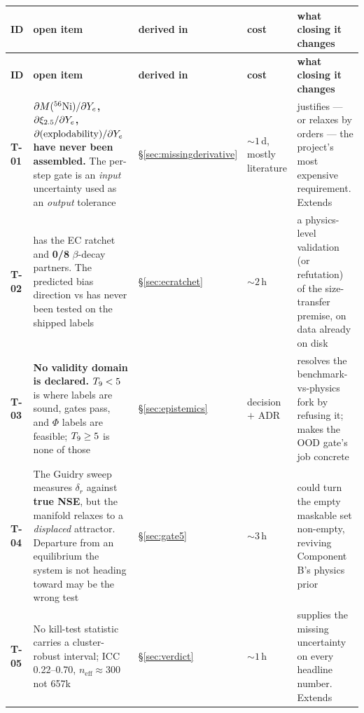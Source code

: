 \begingroup
\footnotesize\setlength{\tabcolsep}{2pt}
\begin{longtable}{@{}L{1.0cm} L{6.0cm} L{2.2cm} L{1.7cm} L{4.7cm}@{}}
\toprule
\textbf{ID} & \textbf{open item} & \textbf{derived in} & \textbf{cost} &
\textbf{what closing it changes} \\
\midrule
\endfirsthead
\toprule
\textbf{ID} & \textbf{open item} & \textbf{derived in} & \textbf{cost} &
\textbf{what closing it changes} \\
\midrule
\endhead
\bottomrule
\endfoot

\textbf{T-01} &
\textbf{$\partial M(\nuc{Ni}{56})/\partial\Ye$, $\partial\xic/\partial\Ye$,
$\partial(\text{explodability})/\partial\Ye$ have never been assembled.} The
per-step gate is an \emph{input} uncertainty used as an \emph{output}
tolerance & \S\ref{sec:missingderivative} & ${\sim}1$\,d, mostly literature &
justifies --- or relaxes by orders --- the project's most expensive
requirement. Extends  \\

\textbf{T-02} &
 has the EC ratchet and \textbf{0/8} $\beta$-decay partners. The
predicted \Ye{} bias direction vs  has never been tested on the
shipped labels & \S\ref{sec:ecratchet} & ${\sim}2$\,h &
a physics-level validation (or refutation) of the size-transfer premise, on
data already on disk \\

\textbf{T-03} &
\textbf{No validity domain is declared.} $\Tn < 5$ is where labels are sound,
gates pass, and $\Phi$ labels are feasible; $\Tn \ge 5$ is none of those &
\S\ref{sec:epistemics} & decision $+$ ADR &
resolves the benchmark-vs-physics fork by refusing it; makes the OOD gate's
job concrete \\

\textbf{T-04} &
The Guidry sweep measures $\delta_r$ against \textbf{true NSE}, but the
manifold relaxes to a \emph{displaced} attractor. Departure from an
equilibrium the system is not heading toward may be the wrong test &
\S\ref{sec:gate5} & ${\sim}3$\,h &
could turn the empty maskable set non-empty, reviving Component B's physics
prior \\

\textbf{T-05} &
No kill-test statistic carries a cluster-robust interval; ICC 0.22--0.70,
$n_{\mathrm{eff}} \approx 300$ not 657k  & \S\ref{sec:verdict} & ${\sim}1$\,h &
supplies the missing uncertainty on every headline number. Extends
 \\


\end{longtable}
